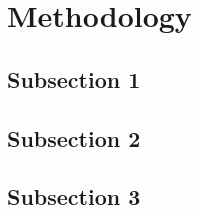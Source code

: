 
\section{Methodology}

\subsection{Subsection 1}

\subsection{Subsection 2}

\subsection{Subsection 3}
